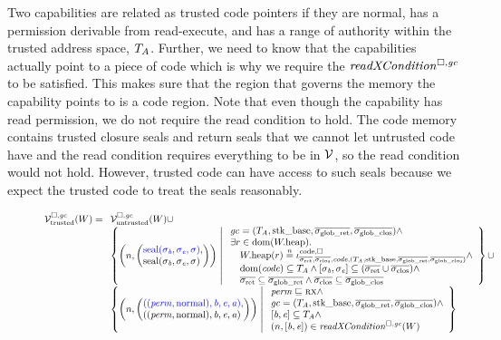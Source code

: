 \begin{jversion}
Two capabilities are related as trusted code pointers if they are normal, has a permission derivable from read-execute, and has a range of authority within the trusted address space, $T_{A}$.
Further, we need to know that the capabilities actually point to a piece of code which is why we require the $\xReadCond{}$ to be satisfied.
This makes sure that the region that governs the memory the capability points to is a code region.
Note that even though the capability has read permission, we do not require the read condition to hold.
The code memory contains trusted closure seals and return seals that we cannot let untrusted code have and the read condition requires everything to be in $\mathcal{V}$, so the read condition would not hold.
However, trusted code can have access to such seals because we expect the trusted code to treat the seals reasonably.
\begin{figure}
  \centering
  \[
  \lrvtrusted[\square,\gc](W) =
  \begin{array}[t]{l}
    \lrv(W)\cup \\
%
    \left\{ \npair{\left(\arraycolsep=0pt\array{l} \src{\seal{\sigma_\baddr,\sigma_\eaddr,\sigma}},\\ \seal{\sigma_\baddr,\sigma_\eaddr,\sigma} \endarray \right)} 
    \; \middle| \;
    \begin{array}{l}
      \gc = (\ta,\stkb,\gsigrets,\gsigcloss)  \wedge \\
      \exists r \in \dom(\pwheap) \ldotp \\
      \quad \pwheap(r) \nequal \codereg{\sigrets,\sigcloss,\code,(\ta,\stkb,\gsigrets,\gsigcloss)} \wedge\\
      \quad \dom(\code) \subseteq \ta \wedge [\sigma_\baddr,\sigma_\eaddr] \subseteq (\sigrets\cup\sigcloss) \wedge\\
      \quad \sigrets \subseteq \gsigrets \wedge \sigcloss \subseteq \gsigcloss
    \end{array}
    \right\} \cup \\
    \left\{ \npair{\left(\arraycolsep=0pt\array{l} \src{((\perm,\normal),\baddr,\eaddr,\aaddr)},\\ ((\perm,\normal),\baddr,\eaddr,\aaddr) \endarray \right)} \;\middle|\; 
    \begin{array}{l}
      \perm \sqsubseteq \rx \wedge \\
      \gc = (\ta,\stkb,\gsigrets,\gsigcloss)  \wedge \\
      {} [\baddr,\eaddr] \subseteq \ta \wedge\\
      \npair{[\baddr,\eaddr]} \in \xReadCond[\square,\gc]{W} 
    \end{array}
    \right\}
  \end{array}
\]


\end{figure}
\end{jversion}
